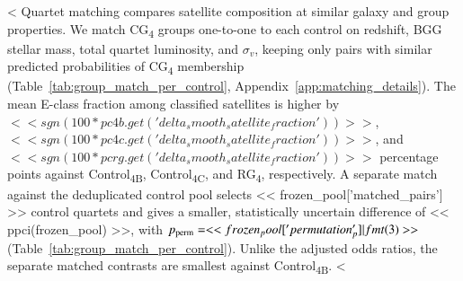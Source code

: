 \documentclass{aa}
\newcommand{\CB}{Control\textsubscript{4B}}
\newcommand{\CC}{Control\textsubscript{4C}}
\newcommand{\CG}{CG\textsubscript{4}}
\newcommand{\RG}{RG\textsubscript{4}}
\begin{document}
<%
Quartet matching compares satellite composition at similar galaxy and group properties. We match \CG{} groups one-to-one to each control on redshift, BGG stellar mass, total quartet luminosity, and \(\sigma_v\), keeping only pairs with similar predicted probabilities of \CG{} membership (Table~\ref{tab:group_match_per_control}, Appendix~\ref{app:matching_details}). The mean E-class fraction among classified satellites is higher by \(<< sgn(100 * pc4b.get('delta_smooth_satellite_fraction')) >>\), \(<< sgn(100 * pc4c.get('delta_smooth_satellite_fraction')) >>\), and \(<< sgn(100 * pcrg.get('delta_smooth_satellite_fraction')) >>\) percentage points against \CB{}, \CC{}, and \RG{}, respectively. A separate match against the deduplicated control pool selects << frozen_pool['matched_pairs'] >> control quartets and gives a smaller, statistically uncertain difference of << ppci(frozen_pool) >>, with \(p_{\rm perm} = << frozen_pool['permutation_p']|fmt(3) >>\) (Table~\ref{tab:group_match_per_control}). Unlike the adjusted odds ratios, the separate matched contrasts are smallest against \CB{}. <%
\end{document}
